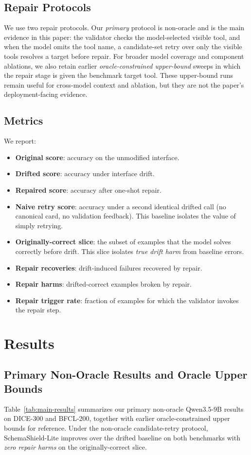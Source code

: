 \documentclass[runningheads]{llncs}
\newcommand{\method}{SchemaShield-Lite\xspace}
\begin{document}
\subsection{Repair Protocols}
We use two repair protocols. Our \emph{primary} protocol is non-oracle and is the
main evidence in this paper: the validator checks the model-selected visible tool,
and when the model omits the tool name, a candidate-set retry over only the visible
tools resolves a target before repair. For broader model coverage and component
ablations, we also retain earlier \emph{oracle-constrained upper-bound} sweeps in
which the repair stage is given the benchmark target tool. These upper-bound runs
remain useful for cross-model context and ablation, but they are not the paper's
deployment-facing evidence.

\subsection{Metrics}
We report:
\begin{itemize}
\item \textbf{Original score}: accuracy on the unmodified interface.
\item \textbf{Drifted score}: accuracy under interface drift.
\item \textbf{Repaired score}: accuracy after one-shot repair.
\item \textbf{Naive retry score}: accuracy under a second identical drifted call
(no canonical card, no validation feedback). This baseline isolates the value of
simply retrying.
\item \textbf{Originally-correct slice}: the subset of examples that the model solves
correctly before drift. This slice isolates \emph{true drift harm} from baseline
errors.
\item \textbf{Repair recoveries}: drift-induced failures recovered by repair.
\item \textbf{Repair harms}: drifted-correct examples broken by repair.
\item \textbf{Repair trigger rate}: fraction of examples for which the validator
invokes the repair step.
\end{itemize}

\section{Results}
\subsection{Primary Non-Oracle Results and Oracle Upper Bounds}
Table~\ref{tab:main-results} summarizes our primary non-oracle Qwen3.5-9B results
on DICE-300 and BFCL-200, together with earlier oracle-constrained upper bounds for
reference. Under the non-oracle candidate-retry protocol, \method improves over the
drifted baseline on both benchmarks with \emph{zero repair harms} on the
originally-correct slice.
\end{document}
